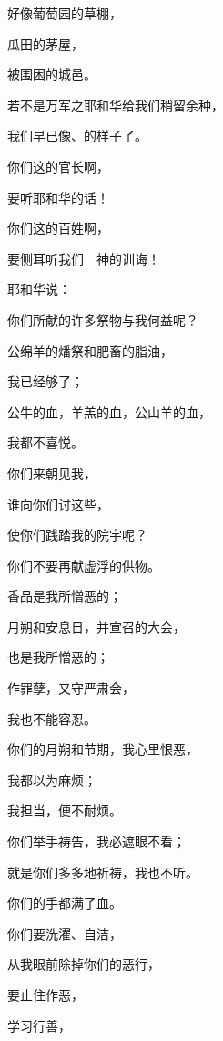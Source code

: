 {\par }{\Q 好像葡萄园的草棚，
\par }{\Q 瓜田的茅屋，
\par }{\Q 被围困的城邑。
\par }{\Q {}若不是万军之耶和华给我们稍留余种，
\par }{\Q 我们早已像{}、{}的样子了。
\par }{\BB \par }{\Q {}你们这{}的官长啊，
\par }{\Q 要听耶和华的话！
\par }{\Q 你们这{}的百姓啊，
\par }{\Q 要侧耳听我们　神的训诲！
\par }{\Q {}耶和华说：
\par }{\Q 你们所献的许多祭物与我何益呢？
\par }{\Q 公绵羊的燔祭和肥畜的脂油，
\par }{\Q 我已经够了；
\par }{\Q 公牛的血，羊羔的血，公山羊的血，
\par }{\Q 我都不喜悦。
\par }{\BB \par }{\Q {}你们来朝见我，
\par }{\Q 谁向你们讨这些，
\par }{\Q 使你们践踏我的院宇呢？
\par }{\Q {}你们不要再献虚浮的供物。
\par }{\Q 香品是我所憎恶的；
\par }{\Q 月朔和安息日，并宣召的大会，
\par }{\Q 也是我所憎恶的；
\par }{\Q 作罪孽，又守严肃会，
\par }{\Q 我也不能容忍。
\par }{\Q {}你们的月朔和节期，我心里恨恶，
\par }{\Q 我都以为麻烦；
\par }{\Q 我担当，便不耐烦。
\par }{\Q {}你们举手祷告，我必遮眼不看；
\par }{\Q 就是你们多多地祈祷，我也不听。
\par }{\Q 你们的手都满了{}血。
\par }{\Q {}你们要洗濯、自洁，
\par }{\Q 从我眼前除掉你们的恶行，
\par }{\Q 要止住作恶，
\par }{\Q {}学习行善，
}

